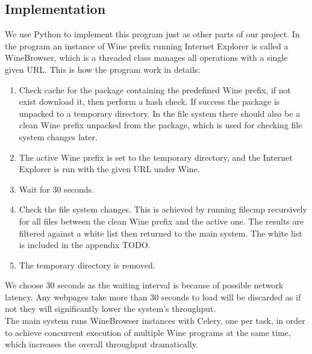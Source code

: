 \subsection{Implementation}
We use Python to implement this program just as other parts of our project. 
In the program an instance of Wine prefix running Internet Explorer is called 
a WineBrowser, which is a threaded class manages all operations with a single 
given URL. This is how the program work in details:
\begin{enumerate}
\item
Check cache for the package containing the predefined Wine prefix, if not 
exist download it, then perform a hash check.
If success the package is unpacked to a temporary directory. 
In the file system there should also be a clean Wine prefix unpacked from the 
package, which is used for checking file system changes later. 
\item
The active Wine prefix is set to the temporary directory, and the Internet 
Explorer is run with the given URL under Wine. 
\item
Wait for 30 seconds.
\item
Check the file system changes. This is achieved by running filecmp recursively 
for all files between the clean Wine prefix and the active one. The results 
are filtered against a white list then returned to the main system. The white 
list is included in the appendix TODO. 
\item
The temporary directory is removed. 
\end{enumerate}
We choose 30 seconds as the waiting interval is because of possible network 
latency. Any webpages take more than 30 seconds to load will be discarded 
as if not they will significantly lower the system's throughput. \\
The main system runs WineBrowser instances with Celery, one per task, in order 
to achieve concurrent execution of multiple Wine programs at the same time, 
which increases the overall throughput dramatically. 